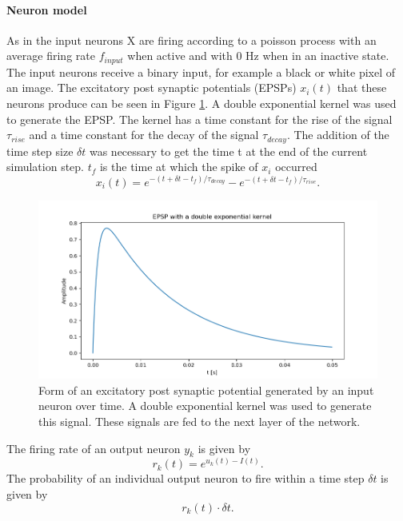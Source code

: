 \paragraph{Neuron model}
As in \citet{nessler} the input neurons X are firing according to a poisson process with an average firing rate $f_{input}$ when active and with 0 Hz when in an inactive state. The input neurons receive a binary input, for example a black or white pixel of an image. The excitatory post synaptic potentials (EPSPs) $x_i(t)$ that these neurons produce can be seen in Figure \ref{fig:XSpike}. A double exponential kernel was used to generate the EPSP. The kernel has a time constant for the rise of the signal $\tau_{rise}$  and a time constant for the decay of the signal $\tau_{decay}$. The addition of the time step size $\delta t$ was necessary to get the time t at the end of the current simulation step. $t_f$ is the time at which the spike of $x_i$ occurred
\begin{equation}
\label{eqn:EPSP}
x_i(t) = e^{-(t + \delta t - t_f) / \tau_{decay}} - e^{-(t + \delta t - t_f) / \tau_{rise}}.
\end{equation}

\begin{figure}
  \includegraphics[width=\linewidth]{figures/XSpike.png}
  \caption{Form of an excitatory post synaptic potential generated by an input neuron over time. A double exponential kernel was used to generate this signal. These signals are fed to the next layer of the network. }
  \label{fig:XSpike}
\end{figure}

The firing rate of an output neuron $y_k$ is given by
\begin{equation}
\label{eqn:rk}
r_k(t) = e^{u_k(t) - I(t)}.
\end{equation}
The probability of an individual output neuron to fire within a time step $\delta t$ is given by
\begin{equation}
\label{eqn:rkdt}
r_k(t) \cdot \delta t.
\end{equation}

